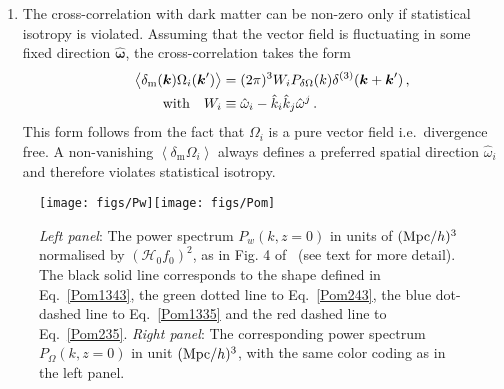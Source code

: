 \documentclass[a4paper,twocolumn,aps,prd,nolongbibliography,superscriptaddress,showpacs,showkeys,amsmath,amssymb,floatfix,nofootinbib]{revtex4-1}
\renewcommand{\[}{\begin{equation}}
\renewcommand{\]}{\end{equation}}
\newcommand{\corr}[1]{\left\langle #1 \right\rangle}
\newcommand{\ms}{\mathrm{m}}
\newcommand{\kb}{\boldsymbol{k}}
\newcommand{\omb}{\boldsymbol{\omega}}
\begin{document}
\begin{enumerate}
The first line of~\eqref{eq:wij} respects statistical homogeneity and isotropy, whereas the second line is non-zero only when isotropy is violated. In what follows, we  absorb the trace $\omega$ into the normalisation of the power spectrum $P_\Omega$. The only possible parity odd term given in  \eqref{eq:aij} is statistically isotropic.

In general, since $\bar\omega_{ij}$ is symmetric, it can be decomposed into a sum of three tensor products of its orthonormal eigenvectors $\bar\omega_i^{I}$, 
\[
\bar\omega_{ij}=\sum_{I=1}^{3}\lambda_{I}\bar\omega_{i}^{I}\bar\omega_{j}^{I}\, ,
\]
with the sum of eigenvalues $\sum\lambda^I=0$. 


\item The cross-correlation with dark matter can be non-zero only if statistical isotropy is violated. Assuming that the vector field is fluctuating in some fixed direction $\hat{\omb}$, the cross-correlation takes the form
\begin{align}
\hspace{0.5cm}\corr{\delta_\ms(\kb)\Omega_{i}(\kb')}  &= (2\pi)^{3} W_i P_{\delta\Omega}(k)\delta^{(3)}(\kb +\kb') \,, \\
\mbox{with} \quad W_i &\equiv \hat\omega_i -  \hat{k}_i\hat{k}_j\hat\omega^j  \,. \notag
\end{align}
This form follows from the fact that $\Omega_i$ is a pure vector field i.e.\ divergence free. A non-vanishing  $\corr{\delta_\ms\Omega_{i}}$ always defines a preferred spatial direction $\hat\omega_i$ and therefore violates statistical isotropy.	
		
\end{enumerate}

\begin{figure*}[t]
\texttt{[image: figs/Pw]}\hspace{0.5cm}\texttt{[image: figs/Pom]}
\caption{\label{f:spectrum}{\it Left panel}: The power spectrum $P_w(k,z=0)$ in units of $({\rm Mpc}/h)^3$ normalised by $(\mathcal{H}_0f_0)^2$, as in Fig. 4 of~\cite{Pueblas:2008uv} (see text for more detail). The black solid line corresponds to the shape defined in Eq.~\eqref{Pom1343}, the green dotted line to Eq.~\eqref{Pom243}, the blue dot-dashed line to Eq.~\eqref{Pom1335} and the red dashed line to Eq.~\eqref{Pom235}. {\it Right panel}: The corresponding power spectrum $P_\Omega(k,z=0)$ in unit $({\rm Mpc}/h)^3$, with the same color coding as in the left panel.}
\end{figure*}
\end{document}
